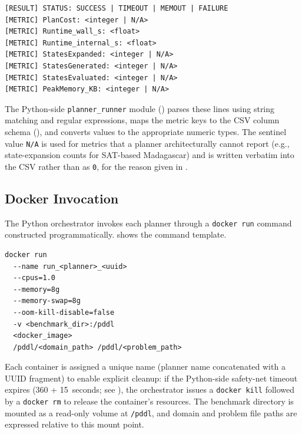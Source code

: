 \begin{lstlisting}[language={}, caption={Standardised output protocol for all planner containers. Each run produces exactly one \texttt{[RESULT]} line followed by metric lines.}, label={lst:output_protocol}, basicstyle=\small\ttfamily, numbers=none, frame=single, xleftmargin=0.5cm, xrightmargin=0.5cm, breaklines=true]
[RESULT] STATUS: SUCCESS | TIMEOUT | MEMOUT | FAILURE
[METRIC] PlanCost: <integer | N/A>
[METRIC] Runtime_wall_s: <float>
[METRIC] Runtime_internal_s: <float>
[METRIC] StatesExpanded: <integer | N/A>
[METRIC] StatesGenerated: <integer | N/A>
[METRIC] StatesEvaluated: <integer | N/A>
[METRIC] PeakMemory_KB: <integer | N/A>
\end{lstlisting}

The Python-side \texttt{planner\_runner} module () parses these lines using string matching and regular expressions, maps the metric keys to the CSV column schema (), and converts values to the appropriate numeric types.
The sentinel value \texttt{N/A} is used for metrics that a planner architecturally cannot report (e.g., state-expansion counts for SAT-based Madagascar) and is written verbatim into the CSV rather than as \texttt{0}, for the reason given in .

\subsection{Docker Invocation}
\label{sec:impl:docker:invocation}

The Python orchestrator invokes each planner through a \texttt{docker run} command constructed programmatically.
 shows the command template.

\begin{lstlisting}[language={}, caption={Docker invocation command template. Resource constraints are injected from the configuration file.}, label={lst:docker_run}, basicstyle=\small\ttfamily, numbers=none, frame=single, xleftmargin=0.5cm, xrightmargin=0.5cm, breaklines=true]
docker run
  --name run_<planner>_<uuid>
  --cpus=1.0
  --memory=8g
  --memory-swap=8g
  --oom-kill-disable=false
  -v <benchmark_dir>:/pddl
  <docker_image>
  /pddl/<domain_path> /pddl/<problem_path>
\end{lstlisting}

Each container is assigned a unique name (planner name concatenated with a UUID fragment) to enable explicit cleanup: if the Python-side safety-net timeout expires (360 + 15~seconds; see ), the orchestrator issues a \texttt{docker kill} followed by a \texttt{docker rm} to release the container's resources.
The benchmark directory is mounted as a read-only volume at \texttt{/pddl}, and domain and problem file paths are expressed relative to this mount point.

